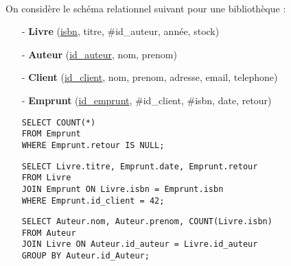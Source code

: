 \documentclass[11pt,a4paper]{article}
\begin{document}
\begin{Exercise}[title = {Résultats de requêtes}]\\
	On considère le schéma relationnel suivant pour une bibliothèque :
	\begin{itemize}
		\item[-] \textbf{Livre} (\underline{isbn}, titre, \#id\_auteur, année, stock)
		\item[-] \textbf{Auteur} (\underline{id\_auteur}, nom, prenom)
		\item[-] \textbf{Client} (\underline{id\_client}, nom, prenom, adresse, email, telephone)
		\item[-] \textbf{Emprunt} (\underline{id\_emprunt}, \#id\_client, \#isbn, date, retour)
	\end{itemize}
	\begin{enumerate}
		\item[]
			\begin{verbatim}
SELECT COUNT(*)
FROM Emprunt
WHERE Emprunt.retour IS NULL;
\end{verbatim}
		\item[]
			\begin{verbatim}
SELECT Livre.titre, Emprunt.date, Emprunt.retour
FROM Livre
JOIN Emprunt ON Livre.isbn = Emprunt.isbn
WHERE Emprunt.id_client = 42;
\end{verbatim}
		\item[]
			\begin{verbatim}
SELECT Auteur.nom, Auteur.prenom, COUNT(Livre.isbn)
FROM Auteur
JOIN Livre ON Auteur.id_auteur = Livre.id_auteur
GROUP BY Auteur.id_Auteur;    
\end{verbatim}
	\end{enumerate}
\end{Exercise}
\end{document}
